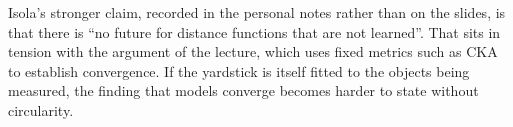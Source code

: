 \begin{aside}
Isola's stronger claim, recorded in the personal notes rather than on the slides, is that
there is ``no future for distance functions that are not learned''. That sits in tension with
the argument of the lecture, which uses fixed metrics such as CKA to establish convergence.
If the yardstick is itself fitted to the objects being measured, the finding that models
converge becomes harder to state without circularity.
\end{aside}
